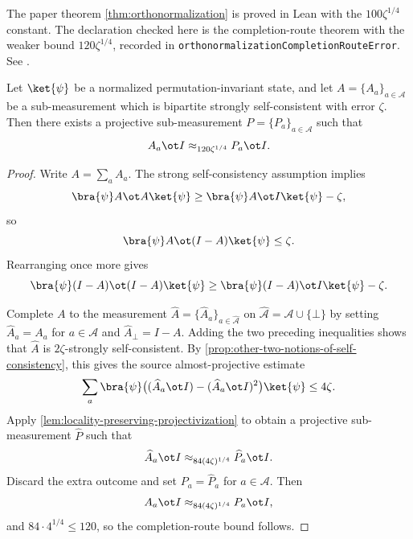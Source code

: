 \begin{proposition}\label{prop:orthonormalization-completion-route}
	\leanok

	The paper theorem \ref{thm:orthonormalization} is proved in Lean with the
	\(100\zeta^{1/4}\) constant.  The declaration checked here is the
	completion-route theorem with the weaker bound
	\(120\zeta^{1/4}\), recorded in
	\texttt{orthonormalizationCompletionRouteError}.  See
	\cite{gap:issue-1032-orthonormalization-constant}.

	Let \(\ket{\psi}\) be a normalized permutation-invariant state, and let
	\(A=\{A_a\}_{a\in\mathcal A}\) be a sub-measurement which is bipartite
	strongly self-consistent with error \(\zeta\).  Then there exists a
	projective sub-measurement \(P=\{P_a\}_{a\in\mathcal A}\) such that
	\[
		A_a \ot I \approx_{120\zeta^{1/4}} P_a \ot I.
	\]
\end{proposition}
\begin{proof}
	\leanok
	Write \(A=\sum_a A_a\).  The strong self-consistency assumption implies
	\[
		\bra{\psi} A \ot A \ket{\psi}
		\geq
		\bra{\psi} A \ot I \ket{\psi} - \zeta,
	\]
	so
	\[
		\bra{\psi} A \ot (I-A) \ket{\psi} \leq \zeta.
	\]
	Rearranging once more gives
	\[
		\bra{\psi} (I-A) \ot (I-A) \ket{\psi}
		\geq
		\bra{\psi} (I-A) \ot I \ket{\psi} - \zeta.
	\]

	Complete \(A\) to the measurement
	\(\widehat A=\{\widehat A_a\}_{a \in \widehat{\mathcal A}}\) on
	\(\widehat{\mathcal A}=\mathcal A \cup \{\bot\}\) by setting
	\(\widehat A_a=A_a\) for \(a \in \mathcal A\) and
	\(\widehat A_{\bot}=I-A\).  Adding the two preceding inequalities shows
	that \(\widehat A\) is \(2\zeta\)-strongly self-consistent.  By
	\ref{prop:other-two-notions-of-self-consistency}, this gives the source
	almost-projective estimate
	\[
		\sum_a \bra{\psi}
		\bigl((\widehat A_a\ot I)-(\widehat A_a\ot I)^2\bigr)
		\ket{\psi}
		\le 4\zeta.
	\]
	Apply \ref{lem:locality-preserving-projectivization} to obtain a projective
	sub-measurement \(\widehat P\) such that
	\[
		\widehat A_a \ot I \approx_{84(4\zeta)^{1/4}} \widehat P_a \ot I.
	\]
	Discard the extra outcome and set \(P_a=\widehat P_a\) for
	\(a \in \mathcal A\).  Then
	\[
		A_a \ot I \approx_{84(4\zeta)^{1/4}} P_a \ot I,
	\]
	and \(84 \cdot 4^{1/4} \leq 120\), so the completion-route bound follows.
\end{proof}

